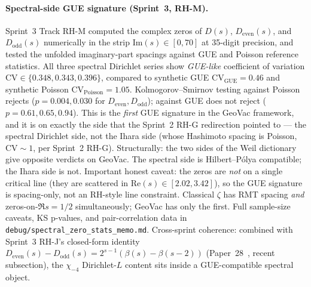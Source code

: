 \documentclass[11pt]{article}
\begin{document}
\paragraph{Spectral-side GUE signature (Sprint~3, RH-M).}
Sprint~3 Track RH-M computed the complex zeros of $D(s)$,
$D_{\mathrm{even}}(s)$, and $D_{\mathrm{odd}}(s)$ numerically in the
strip $\mathrm{Im}(s) \in [0, 70]$ at 35-digit precision, and tested
the unfolded imaginary-part spacings against GUE and Poisson
reference statistics. All three spectral Dirichlet series show
\emph{GUE-like} coefficient of variation
$\mathrm{CV} \in \{0.348, 0.343, 0.396\}$, compared to synthetic GUE
$\mathrm{CV}_{\mathrm{GUE}} = 0.46$ and synthetic Poisson
$\mathrm{CV}_{\mathrm{Poisson}} = 1.05$. Kolmogorov--Smirnov testing
against Poisson rejects ($p = 0.004, 0.030$ for $D_{\mathrm{even}},
D_{\mathrm{odd}}$); against GUE does not reject ($p = 0.61, 0.65, 0.94$).
This is the \emph{first} GUE signature in the GeoVac framework, and
it is on exactly the side that the Sprint~2 RH-G redirection pointed
to --- the spectral Dirichlet side, not the Ihara side (whose
Hashimoto spacing is Poisson, $\mathrm{CV} \sim 1$, per Sprint~2
RH-G). Structurally: the two sides of the Weil dictionary give
opposite verdicts on GeoVac. The spectral side is Hilbert--P\'olya
compatible; the Ihara side is not. Important honest caveat: the zeros
are \emph{not} on a single critical line (they are scattered in
$\mathrm{Re}(s) \in [2.02, 3.42]$), so the GUE signature is spacing-only,
not an RH-style line constraint. Classical $\zeta$ has RMT spacing
\emph{and} zeros-on-$\Re s = 1/2$ simultaneously; GeoVac has only the
first. Full sample-size caveats, KS p-values, and pair-correlation
data in \texttt{debug/spectral\_zero\_stats\_memo.md}. Cross-sprint
coherence: combined with Sprint~3 RH-J's closed-form identity
$D_{\mathrm{even}}(s) - D_{\mathrm{odd}}(s) = 2^{s-1}(\beta(s) - \beta(s-2))$
(Paper~28~\cite{paper28}, recent subsection), the $\chi_{-4}$
Dirichlet-$L$ content sits inside a GUE-compatible spectral object.
\end{document}
